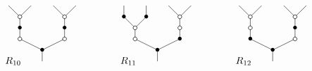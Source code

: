 \documentclass[../main.tex]{subfiles}
\begin{document}
\begin{ex}
    $$
        \xy
        <0.08cm, 0cm>:
        (0.0, 0.0)*{}="1"; %
        (0.0, 5.0)*=0{\bullet}="2"; %
        (-10.0, 10.0)*\cir<2pt>{}="3"; %
        (-10.0, 15.0)*=0{\bullet}="4"; %
        (-10.0, 20.0)*\cir<2pt>{}="5"; %
        (-15.0, 25.0)*{}="6"; %
        (-5.0, 25.0)*{}="7"; %
        (10.0, 10.0)*\cir<2pt>{}="8"; %
        (10.0, 15.0)*=0{\bullet}="9"; %
        (10.0, 20.0)*\cir<2pt>{}="10"; %
        (5.0, 25.0)*{}="11"; %
        (15.0, 25.0)*{}="12"; %
        "1";"2" **\dir{-};
        "2";"3" **\dir{-};
        "3";"4" **\dir{-};
        "4";"5" **\dir{-};
        "5";"6" **\dir{-};
        "5";"7" **\dir{-};
        "2";"8" **\dir{-};
        "8";"9" **\dir{-};
        "9";"10" **\dir{-};
        "10";"11" **\dir{-};
        "10";"12" **\dir{-};
        (-13,0)*{R_{10}};
        \endxy
        \xy
        <0.08cm, 0cm>:
        (-10, 0.0)*{}="1";
        (10, 10.0)*{}="2";
        \endxy
        \xy
        <0.08cm, 0cm>:
        (0.0, 0.0)*{}="1"; %
        (0.0, 5.0)*=0{\bullet}="2"; %
        (-10.0, 10.0)*\cir<2pt>{}="3"; %
        (-10.0, 15.0)*\cir<2pt>{}="4"; %
        (-15.0, 20.0)*=0{\bullet}="5"; %
        (-15.0, 25.0)*{}="6"; %
        (-5.0, 20.0)*=0{\bullet}="7"; %
        (-5.0, 25.0)*{}="8"; %
        (10.0, 10.0)*=0{\bullet}="9"; %
        (10.0, 15.0)*\cir<2pt>{}="10"; %
        (10.0, 20.0)*\cir<2pt>{}="11"; %
        (5.0, 25.0)*{}="12"; %
        (15.0, 25.0)*{}="13"; %
        "1";"2" **\dir{-};
        "2";"3" **\dir{-};
        "3";"4" **\dir{-};
        "4";"5" **\dir{-};
        "5";"6" **\dir{-};
        "4";"7" **\dir{-};
        "7";"8" **\dir{-};
        "2";"9" **\dir{-};
        "9";"10" **\dir{-};
        "10";"11" **\dir{-};
        "11";"12" **\dir{-};
        "11";"13" **\dir{-};
        (-13,0)*{R_{11}};
        \endxy
        \xy
        <0.08cm, 0cm>:
        (-10, 0.0)*{}="1";
        (10, 10.0)*{}="2";
        \endxy
        \xy
        <0.08cm, 0cm>:
        (0.0, 0.0)*{}="1"; %
        (0.0, 5.0)*=0{\bullet}="2"; %
        (-10.0, 10.0)*=0{\bullet}="3"; %
        (-10.0, 15.0)*\cir<2pt>{}="4"; %
        (-10.0, 20.0)*\cir<2pt>{}="5"; %
        (-15.0, 25.0)*{}="6"; %
        (-5.0, 25.0)*{}="7"; %
        (10.0, 10.0)*\cir<2pt>{}="8"; %
        (10.0, 15.0)*=0{\bullet}="9"; %
        (10.0, 20.0)*\cir<2pt>{}="10"; %
        (5.0, 25.0)*{}="11"; %
        (15.0, 25.0)*{}="12"; %
        "1";"2" **\dir{-};
        "2";"3" **\dir{-};
        "3";"4" **\dir{-};
        "4";"5" **\dir{-};
        "5";"6" **\dir{-};
        "5";"7" **\dir{-};
        "2";"8" **\dir{-};
        "8";"9" **\dir{-};
        "9";"10" **\dir{-};
        "10";"11" **\dir{-};
        "10";"12" **\dir{-};
        (-13,0)*{R_{12}};
        \endxy
        \xy
        <0.08cm, 0cm>:
        (-10, 0.0)*{}="1";
        (10, 10.0)*{}="2";
        \endxy
    $$


\end{ex}
\end{document}
